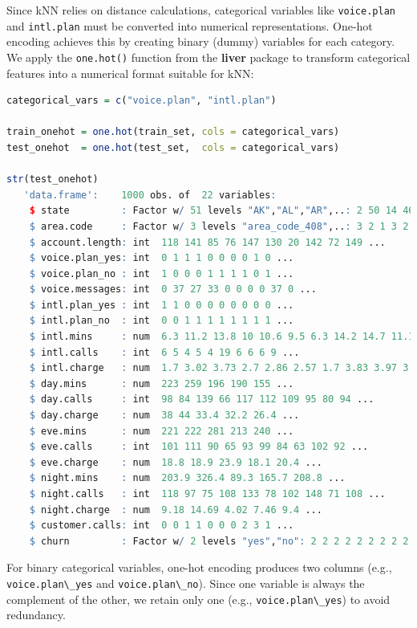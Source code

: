 \documentclass[
]{book}
\newcommand{\passthrough}[1]{#1}
\theoremstyle{definition}
\theoremstyle{definition}
\theoremstyle{definition}
\theoremstyle{definition}
\theoremstyle{remark}
\begin{document}
Since kNN relies on distance calculations, categorical variables like \passthrough{\lstinline!voice.plan!} and \passthrough{\lstinline!intl.plan!} must be converted into numerical representations. One-hot encoding achieves this by creating binary (dummy) variables for each category. We apply the \passthrough{\lstinline!one.hot()!} function from the \textbf{liver} package to transform categorical features into a numerical format suitable for kNN:

\begin{lstlisting}[language=R]
categorical_vars = c("voice.plan", "intl.plan")

train_onehot = one.hot(train_set, cols = categorical_vars)
test_onehot  = one.hot(test_set,  cols = categorical_vars)

str(test_onehot)
   'data.frame':    1000 obs. of  22 variables:
    $ state         : Factor w/ 51 levels "AK","AL","AR",..: 2 50 14 46 10 4 25 15 11 32 ...
    $ area.code     : Factor w/ 3 levels "area_code_408",..: 3 2 1 3 2 2 2 2 2 1 ...
    $ account.length: int  118 141 85 76 147 130 20 142 72 149 ...
    $ voice.plan_yes: int  0 1 1 1 0 0 0 0 1 0 ...
    $ voice.plan_no : int  1 0 0 0 1 1 1 1 0 1 ...
    $ voice.messages: int  0 37 27 33 0 0 0 0 37 0 ...
    $ intl.plan_yes : int  1 1 0 0 0 0 0 0 0 0 ...
    $ intl.plan_no  : int  0 0 1 1 1 1 1 1 1 1 ...
    $ intl.mins     : num  6.3 11.2 13.8 10 10.6 9.5 6.3 14.2 14.7 11.1 ...
    $ intl.calls    : int  6 5 4 5 4 19 6 6 6 9 ...
    $ intl.charge   : num  1.7 3.02 3.73 2.7 2.86 2.57 1.7 3.83 3.97 3 ...
    $ day.mins      : num  223 259 196 190 155 ...
    $ day.calls     : int  98 84 139 66 117 112 109 95 80 94 ...
    $ day.charge    : num  38 44 33.4 32.2 26.4 ...
    $ eve.mins      : num  221 222 281 213 240 ...
    $ eve.calls     : int  101 111 90 65 93 99 84 63 102 92 ...
    $ eve.charge    : num  18.8 18.9 23.9 18.1 20.4 ...
    $ night.mins    : num  203.9 326.4 89.3 165.7 208.8 ...
    $ night.calls   : int  118 97 75 108 133 78 102 148 71 108 ...
    $ night.charge  : num  9.18 14.69 4.02 7.46 9.4 ...
    $ customer.calls: int  0 0 1 1 0 0 0 2 3 1 ...
    $ churn         : Factor w/ 2 levels "yes","no": 2 2 2 2 2 2 2 2 2 2 ...
\end{lstlisting}

For binary categorical variables, one-hot encoding produces two columns (e.g., \passthrough{\lstinline!voice.plan\_yes!} and \passthrough{\lstinline!voice.plan\_no!}). Since one variable is always the complement of the other, we retain only one (e.g., \passthrough{\lstinline!voice.plan\_yes!}) to avoid redundancy.
\end{document}
